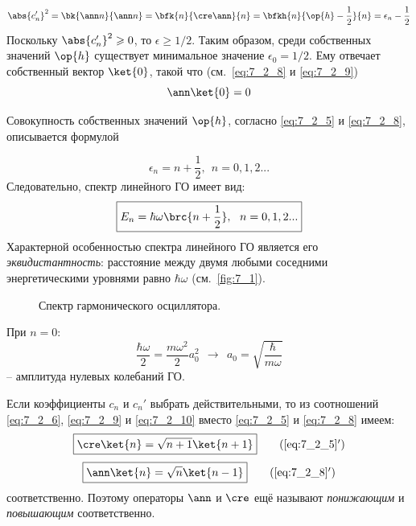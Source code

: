 \begin{equation}
\label{eq:7_2_9}
	\abs{c_n'}^2 = \bk{\ann n}{\ann n} = \bfk{n}{\cre\ann}{n} = \bfkh{n}{\op{h} - \frac{1}{2}}{n} = \epsilon_n - \frac{1}{2}
\end{equation}%
%
Поскольку $\abs{c_n'}^2 \geqslant 0$, то $\epsilon \geqslant 1/2$. Таким образом, среди собственных значений $\op{h}$ существует минимальное значение $\epsilon_0 = 1/2$. Ему отвечает собственный вектор $\ket{0}$, такой что (см.~\eqref{eq:7_2_8} и \eqref{eq:7_2_9})
$$
	\ann \ket{0} = 0
$$

Совокупность собственных значений $\op{h}$, согласно \eqref{eq:7_2_5} и \eqref{eq:7_2_8}, описывается формулой

\begin{equation}
\label{eq:7_2_10}
\epsilon_n = n + \frac{1}{2},~~ n = 0,1,2...
\end{equation}%
%
Следовательно, спектр линейного ГО имеет вид:
$$
\boxed {
	E_n = \hbar \omega \brc{n + \frac{1}{2}},~~ n = 0,1,2...
}
$$%
%
Характерной особенностью спектра линейного ГО является его {\em эквидистантность}: расстояние между двумя любыми соседними энергетическими уровнями равно $\hbar \omega$ (см.~\autoref{fig:7_1}).

\begin{figure}[h]
\centering
{}
\caption{Спектр гармонического осциллятора.} \label{fig:7_1}
\end{figure}

При $n = 0$:
$$
\frac{\hbar \omega}{2} = \frac{m\omega^2}{2} a_0^2  ~~\to~~
\boxed{
  a_0 = \sqrt{\frac{\hbar}{m\omega}}
}
$$
-- амплитуда нулевых колебаний ГО.

Если коэффициенты $c_n$ и $c_n'$ выбрать действительными, то из соотношений \eqref{eq:7_2_6}, \eqref{eq:7_2_9} и \eqref{eq:7_2_10} вместо \eqref{eq:7_2_5} и \eqref{eq:7_2_8} имеем:
\begin{equation}
\label{eq:7_2_5_add}
\boxed {
	\cre\ket{n} = \sqrt{n+1}\ket{n+1}
}
\tag{\ref{eq:7_2_5}$'$}
\end{equation}%
\begin{equation}
\label{eq:7_2_8_add}
\boxed {
	\ann\ket{n} = \sqrt{n}\ket{n-1}
}
\tag{\ref{eq:7_2_8}$'$}
\end{equation}%
%
соответственно. Поэтому операторы $\ann$ и $\cre$ ещё называют {\em понижающим} и {\em повышающим} соответственно.

